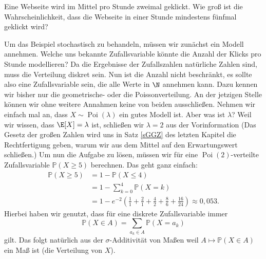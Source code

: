 \begin{beispiel}
	Eine Webseite wird im Mittel pro Stunde zweimal geklickt. Wie groß ist die Wahrscheinlichkeit, dass die Webseite in einer Stunde mindestens fünfmal geklickt wird?\smallskip
	
	Um das Beispiel stochastisch zu behandeln, m\"ussen wir zun\"achst ein Modell annehmen. Welche uns bekannte Zufallsvariable k\"onnte die Anzahl der Klicks pro Stunde modellieren? Da die Ergebnisse der Zufallszahlen nat\"urliche Zahlen sind, muss die Verteilung diskret sein. Nun ist die Anzahl nicht beschr\"ankt, es sollte also eine Zufallsvariable sein, die alle Werte in $\N$ annehmen kann. Dazu kennen wir bisher nur die geometrische- oder die Poissonverteilung. An der jetzigen Stelle k\"onnen wir ohne weitere Annahmen keine von beiden ausschlie\ss en. Nehmen wir einfach mal an, dass $X\sim \operatorname{Poi}(\lambda)$ ein gutes Modell ist. Aber was ist $\lambda$? Weil wir wissen, dass $\E[X]=\lambda$ ist, schlie\ss en wir $\lambda=2$ aus der Vorinformation (Das Gesetz der gro\ss en Zahlen wird uns in Satz \ref{sGGZ} des letzten Kapitel die Rechtfertigung geben, warum wir aus dem Mittel auf den Erwartungswert schlie\ss en.) Um nun die Aufgabe zu l\"osen, m\"ussen wir f\"ur eine $\operatorname{Poi}(2)$-verteilte Zufallsvariable $\mathbb P(X\geq 5)$ berechnen. Das geht ganz einfach:
	\begin{align*}
	\mathbb{P}(X \geq 5) &= 1 - \mathbb{P}(X \leq 4)\\
	& = 1 - \sum\limits_{k=0}^{4} \mathbb{P}(X = k)\\ 
	&= 1 - e^{-2} \left(\frac{1}{1} + \frac{2}{1} + \frac{4}{2} + \frac{8}{6} + \frac{16}{24}\right) \approx 0,053.
	\end{align*} 
	Hierbei haben wir genutzt, dass f\"ur eine diskrete Zufallsvariable immer $$\mathbb P(X\in A)=\sum_{a_k\in A} \mathbb P(X=a_k)$$ gilt. Das folgt nat\"urlich aus der $\sigma$-Additivit\"at von Ma\ss en weil $A\mapsto \mathbb P(X\in A)$ ein Ma\ss{} ist (die Verteilung von $X$).
	\end{beispiel}


